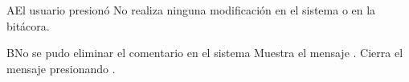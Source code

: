 
\label{SP2-CU13-A}
\begin{UCtrayectoriaA}{A}{El usuario presionó }
  \UCpaso No realiza ninguna modificación en el sistema o en la bitácora.
\end{UCtrayectoriaA}

\label{SP2-CU13-B}
\begin{UCtrayectoriaA}{B}{No se pudo eliminar el comentario en el sistema}
  \UCpaso Muestra el mensaje .
  \UCpaso[\UCactor] Cierra el mensaje presionando .
\end{UCtrayectoriaA}
